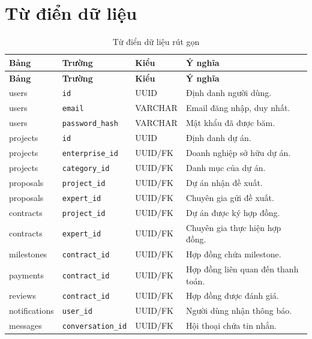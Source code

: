 \section{Từ điển dữ liệu}
\label{sec:data-dictionary}

\begin{longtable}{|p{3.0cm}|p{3.0cm}|p{2.2cm}|p{5.4cm}|}
\caption{Từ điển dữ liệu rút gọn}
\label{tab:data-dictionary} \\ \hline
\textbf{Bảng} & \textbf{Trường} & \textbf{Kiểu} & \textbf{Ý nghĩa} \\ \hline
\endfirsthead
\hline
\textbf{Bảng} & \textbf{Trường} & \textbf{Kiểu} & \textbf{Ý nghĩa} \\ \hline
\endhead

users & \texttt{id} & UUID & Định danh người dùng. \\ \hline
users & \texttt{email} & VARCHAR & Email đăng nhập, duy nhất. \\ \hline
users & \texttt{password\_hash} & VARCHAR & Mật khẩu đã được băm. \\ \hline
projects & \texttt{id} & UUID & Định danh dự án. \\ \hline
projects & \texttt{enterprise\_id} & UUID/FK & Doanh nghiệp sở hữu dự án. \\ \hline
projects & \texttt{category\_id} & UUID/FK & Danh mục của dự án. \\ \hline
proposals & \texttt{project\_id} & UUID/FK & Dự án nhận đề xuất. \\ \hline
proposals & \texttt{expert\_id} & UUID/FK & Chuyên gia gửi đề xuất. \\ \hline
contracts & \texttt{project\_id} & UUID/FK & Dự án được ký hợp đồng. \\ \hline
contracts & \texttt{expert\_id} & UUID/FK & Chuyên gia thực hiện hợp đồng. \\ \hline
milestones & \texttt{contract\_id} & UUID/FK & Hợp đồng chứa milestone. \\ \hline
payments & \texttt{contract\_id} & UUID/FK & Hợp đồng liên quan đến thanh toán. \\ \hline
reviews & \texttt{contract\_id} & UUID/FK & Hợp đồng được đánh giá. \\ \hline
notifications & \texttt{user\_id} & UUID/FK & Người dùng nhận thông báo. \\ \hline
messages & \texttt{conversation\_id} & UUID/FK & Hội thoại chứa tin nhắn. \\ \hline
\end{longtable}

